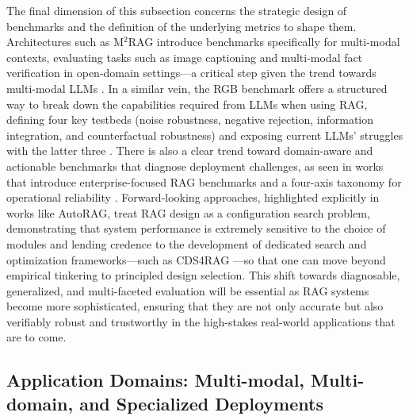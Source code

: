 \documentclass[11pt,a4paper]{article}
\begin{document}
The final dimension of this subsection concerns the strategic design of benchmarks and the definition of the underlying metrics to shape them. Architectures such as M$^{2}$RAG introduce benchmarks specifically for multi-modal contexts, evaluating tasks such as image captioning and multi-modal fact verification in open-domain settings---a critical step given the trend towards multi-modal LLMs \cite{arxiv:2502.17297v2}. In a similar vein, the RGB benchmark offers a structured way to break down the capabilities required from LLMs when using RAG, defining four key testbeds (noise robustness, negative rejection, information integration, and counterfactual robustness) and exposing current LLMs' struggles with the latter three \cite{arxiv:2309.01431v2}. There is also a clear trend toward domain-aware and actionable benchmarks that diagnose deployment challenges, as seen in works that introduce enterprise-focused RAG benchmarks and a four-axis taxonomy for operational reliability \cite{arxiv:2604.02640v1}. Forward-looking approaches, highlighted explicitly in works like AutoRAG, treat RAG design as a configuration search problem, demonstrating that system performance is extremely sensitive to the choice of modules and lending credence to the development of dedicated search and optimization frameworks---such as CDS4RAG \cite{arxiv:2410.20878v1,arxiv:2605.08333v1}---so that one can move beyond empirical tinkering to principled design selection. This shift towards diagnosable, generalized, and multi-faceted evaluation will be essential as RAG systems become more sophisticated, ensuring that they are not only accurate but also verifiably robust and trustworthy in the high-stakes real-world applications that are to come.


\subsection{Application Domains: Multi-modal, Multi-domain, and Specialized Deployments}
\end{document}
